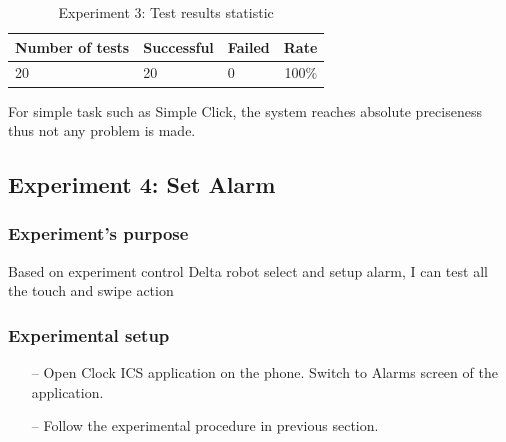 \begin{table}[H]
	\centering
	\caption{Experiment 3: Test results statistic}	
	\label{tab:exp3_result_stat}
	\begin{tabular}{|lll|r|}
		\hline
		\textbf{Number of tests} & \textbf{Successful} & \textbf{Failed} & \textbf{Rate} \\
		\hline
		20 & 20 & 0 & 100$\%$\\
		\hline
	\end{tabular}
\end{table}
For simple task such as Simple Click, the system reaches absolute preciseness thus not any problem is made.

\subsection{Experiment 4: Set Alarm}
\subsubsection{Experiment's purpose}
Based on experiment control Delta robot select and setup alarm, I can test all the touch and swipe action
\subsubsection{Experimental setup}
	\begin{itemize}
		\item[--]Open Clock ICS application on the phone. Switch to Alarms screen of the application.
		\item[--]Follow the experimental procedure in previous section.
	\end{itemize}

